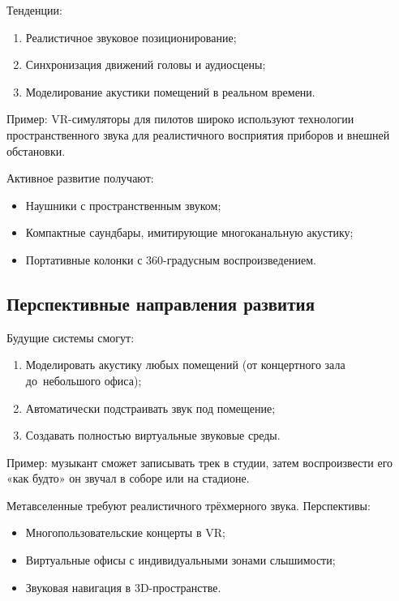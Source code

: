 \documentclass{ou}
\begin{document}
Тенденции:
\begin{enumerate}[leftmargin=0em, itemindent=3.75em, nosep, label=\arabic*)]
\item Реалистичное звуковое позиционирование;
\item Синхронизация движений головы и аудиосцены;
\item Моделирование акустики помещений в реальном времени.
\end{enumerate}

Пример: VR-симуляторы для пилотов широко используют технологии пространственного звука для реалистичного восприятия приборов и внешней обстановки.

Активное развитие получают:
\begin{itemize}[label=-, leftmargin=0em, itemindent=3.35em, nosep]
\item Наушники с пространственным звуком;
\item Компактные саундбары, имитирующие многоканальную акустику;
\item Портативные колонки с 360-градусным воспроизведением.
\end{itemize}
\subsection{Перспективные направления развития}
Будущие системы смогут:
\begin{enumerate}[leftmargin=0em, itemindent=3.75em, nosep, label=\arabic*)]
\item Моделировать акустику любых помещений (от концертного зала до~небольшого офиса);
\item Автоматически подстраивать звук под помещение;
\item Создавать полностью виртуальные звуковые среды.
\end{enumerate}

Пример: музыкант сможет записывать трек в студии, затем воспроизвести его «как будто» он звучал в соборе или на стадионе.

Метавселенные требуют реалистичного трёхмерного звука. Перспективы:
\begin{itemize}[label=-, leftmargin=0em, itemindent=3.35em, nosep]
\item Многопользовательские концерты в VR;
\item Виртуальные офисы с индивидуальными зонами слышимости;
\item Звуковая навигация в 3D-пространстве.
\end{itemize}
\end{document}
